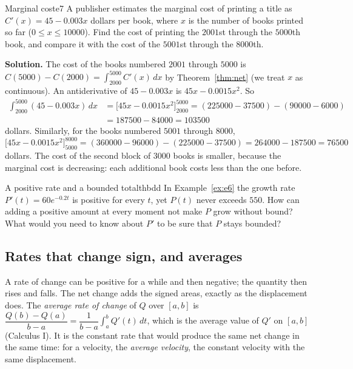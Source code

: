 \documentclass[11pt]{article}
\begin{document}
\begin{exmp}{Marginal cost}{e7}
A publisher estimates the marginal cost of printing a title as $C'(x)=45-0.003x$ dollars per book, where $x$ is the number of books printed so far ($0\le x\le10000$). Find the cost of printing the $2001$st through the $5000$th book, and compare it with the cost of the $5001$st through the $8000$th.

\textbf{Solution.} The cost of the books numbered $2001$ through $5000$ is $C(5000)-C(2000)=\int_{2000}^{5000}C'(x)\,dx$ by Theorem~\ref{thm:net} (we treat $x$ as continuous). An antiderivative of $45-0.003x$ is $45x-0.0015x^2$. So
\[
\begin{aligned}
\int_{2000}^{5000}(45-0.003x)\,dx&=\Big[45x-0.0015x^2\Big]_{2000}^{5000}=(225000-37500)-(90000-6000)\\
&=187500-84000=103500
\end{aligned}
\]
dollars. Similarly, for the books numbered $5001$ through $8000$,
\[
\Big[45x-0.0015x^2\Big]_{5000}^{8000}=(360000-96000)-(225000-37500)=264000-187500=76500
\]
dollars. The cost of the second block of $3000$ books is smaller, because the marginal cost is decreasing: each additional book costs less than the one before.
\end{exmp}

\begin{think}{A positive rate and a bounded total}{thbdd}
In Example~\ref{ex:e6} the growth rate $P'(t)=60e^{-0.2t}$ is positive for every $t$, yet $P(t)$ never exceeds $550$. How can adding a positive amount at every moment not make $P$ grow without bound? What would you need to know about $P'$ to be sure that $P$ stays bounded?
\end{think}


\subsection*{Rates that change sign, and averages}

A rate of change can be positive for a while and then negative; the quantity then rises and falls. The net change adds the signed areas, exactly as the displacement does. The \emph{average rate of change} of $Q$ over $[a,b]$ is $\dfrac{Q(b)-Q(a)}{b-a}=\dfrac1{b-a}\int_a^bQ'(t)\,dt$, which is the average value of $Q'$ on $[a,b]$ (Calculus I). It is the constant rate that would produce the same net change in the same time: for a velocity, the \emph{average velocity}, the constant velocity with the same displacement.
\end{document}
